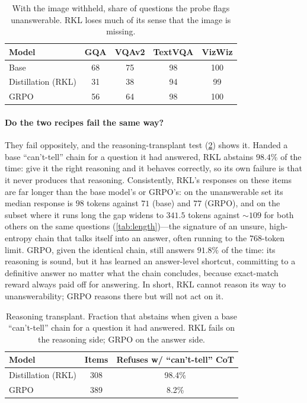 \documentclass[10pt,twocolumn,letterpaper]{article}
\begin{document}
\begin{table}[tb]
\centering
\small
\caption{With the image withheld, share of questions the probe flags unanswerable. RKL
loses much of its sense that the image is missing.}
\label{tab:probenoimg}
\begin{tabular}{@{}lcccc@{}}
\toprule
Model & GQA & VQAv2 & TextVQA & VizWiz \\
\midrule
Base               & 68 & 75 & 98 & 100 \\
Distillation (RKL) & 31 & 38 & 94 & 99 \\
GRPO               & 56 & 64 & 98 & 100 \\
\bottomrule
\end{tabular}
\end{table}

\paragraph{Do the two recipes fail the same way?}
\label{sec:rq2}

They fail oppositely, and the reasoning-transplant test (\cref{tab:transplant}) shows it.
Handed a base ``can't-tell'' chain for a question it had answered, RKL abstains $98.4\%$
of the time: give it the right reasoning and it behaves correctly, so its own failure is
that it never produces that reasoning. Consistently, RKL's responses on these items are
far longer than the base model's or GRPO's: on the unanswerable set its median response
is $98$ tokens against $71$ (base) and $77$ (GRPO), and on the subset where it runs long
the gap widens to $341.5$ tokens against $\sim\!109$ for both others on the same questions
(\cref{tab:length})---the signature of an unsure, high-entropy chain that talks itself
into an answer, often running to the $768$-token limit. GRPO, given the identical chain,
still answers $91.8\%$ of the time: its reasoning is sound, but it has learned an
answer-level shortcut, committing to a definitive answer no matter what the chain
concludes, because exact-match reward always paid off for answering. In short, RKL cannot
reason its way to unanswerability; GRPO reasons there but will not act on it.

\begin{table}[tb]
\centering
\small
\caption{Reasoning transplant. Fraction that abstains when given a base ``can't-tell''
chain for a question it had answered. RKL fails on the reasoning side; GRPO on the answer
side.}
\label{tab:transplant}
\begin{tabular}{@{}lcc@{}}
\toprule
Model & Items & Refuses w/ ``can't-tell'' CoT \\
\midrule
Distillation (RKL) & 308 & 98.4\% \\
GRPO               & 389 & 8.2\% \\
\bottomrule
\end{tabular}
\end{table}
\end{document}
